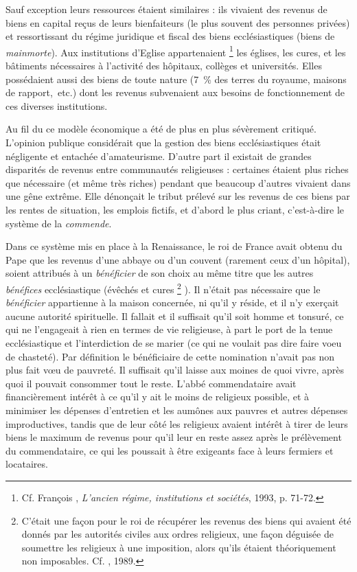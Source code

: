  Sauf exception leurs ressources étaient similaires : ils vivaient des revenus de biens en capital reçus de leurs bienfaiteurs (le plus souvent des personnes privées) et ressortissant du régime juridique et fiscal des biens ecclésiastiques (biens de \emph{mainmorte}). Aux institutions d'Eglise appartenaient%
\footnote{Cf. François , \emph{L'ancien régime, institutions et sociétés}, 1993, p. 71-72.} 
les églises, les cures, et les bâtiments nécessaires à l'activité des hôpitaux, collèges et universités. Elles possédaient aussi des biens de toute nature (7~\% des terres du royaume, maisons de rapport,~etc.) dont les revenus subvenaient aux besoins de fonctionnement de ces diverses institutions. 

 Au fil du  ce modèle économique a été de plus en plus sévèrement critiqué. L'opinion publique considérait que la gestion des biens ecclésiastiques était négligente et entachée d'amateurisme. D'autre part il existait de grandes disparités de revenus entre communautés religieuses : certaines étaient plus riches que nécessaire (et même très riches) pendant que beaucoup d'autres vivaient dans une gêne extrême. Elle dénonçait le tribut prélevé sur les revenus de ces biens par les rentes de situation, les emplois fictifs, et d'abord le plus criant, c'est-à-dire le système de la \emph{commende}.

 Dans ce système mis en place à la Renaissance, le roi de France avait obtenu du Pape que les revenus d'une abbaye ou d'un couvent (rarement ceux d'un hôpital), soient attribués à un \emph{bénéficier} de son choix au même titre que les autres \emph{bénéfices} ecclésiastique (évêchés et cures%
\footnote{C'était une façon pour le roi de récupérer les revenus des biens qui avaient été donnés par les autorités civiles aux ordres religieux, une façon déguisée de soumettre les religieux à une imposition, alors qu'ils étaient théoriquement non imposables. Cf. , 1989.}%
). Il n'était pas nécessaire que le \emph{bénéficier} appartienne à la maison concernée, ni qu'il y réside, et il n'y exerçait aucune autorité spirituelle. Il fallait et il suffisait qu'il soit homme et tonsuré, ce qui ne l'engageait à rien en termes de vie religieuse, à part le port de la tenue ecclésiastique et l'interdiction de se marier (ce qui ne voulait pas dire faire voeu de chasteté). Par définition le bénéficiaire de cette nomination n'avait pas non plus fait vœu de pauvreté. Il suffisait qu'il laisse aux moines de quoi vivre, après quoi il pouvait consommer tout le reste. L'abbé commendataire avait financièrement intérêt à ce qu'il y ait le moins de religieux possible, et à minimiser les dépenses d'entretien et les aumônes aux pauvres et autres dépenses improductives, tandis que de leur côté les religieux avaient intérêt à tirer de leurs biens le maximum de revenus pour qu'il leur en reste assez après le prélèvement du commendataire, ce qui les poussait à être exigeants face à leurs fermiers et locataires. 

